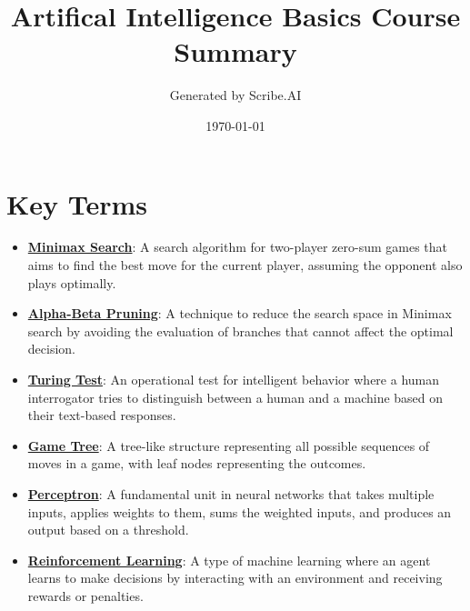 \documentclass{article}%
\title{Artifical Intelligence Basics Course Summary}%
\author{Generated by Scribe.AI}%
\date{\today}%
\begin{document}
%
\normalsize%
\maketitle%
\section{Key Terms}%
\label{sec:KeyTerms}%
\begin{itemize}[leftmargin=*]%
\item \href{https://www.math.purdue.edu/~yipn/351/02L2-Intro.pdf#page=22}{\textbf{Minimax Search}}: A search algorithm for two-player zero-sum games that aims to find the best move for the current player, assuming the opponent also plays optimally.%
\item \href{https://www.math.purdue.edu/~yipn/351/02L2-Intro.pdf#page=23}{\textbf{Alpha{-}Beta Pruning}}: A technique to reduce the search space in Minimax search by avoiding the evaluation of branches that cannot affect the optimal decision.%
\item \href{https://www.math.purdue.edu/~yipn/351/02L2-Intro.pdf#page=6}{\textbf{Turing Test}}: An operational test for intelligent behavior where a human interrogator tries to distinguish between a human and a machine based on their text-based responses.%
\item \href{https://www.math.purdue.edu/~yipn/351/02L2-Intro.pdf#page=11}{\textbf{Game Tree}}: A tree-like structure representing all possible sequences of moves in a game, with leaf nodes representing the outcomes.%
\item \href{https://www.math.purdue.edu/~yipn/351/02L2-Intro.pdf#page=45}{\textbf{Perceptron}}: A fundamental unit in neural networks that takes multiple inputs, applies weights to them, sums the weighted inputs, and produces an output based on a threshold.%
\item \href{https://www.math.purdue.edu/~yipn/351/02L2-Intro.pdf#page=46}{\textbf{Reinforcement Learning}}: A type of machine learning where an agent learns to make decisions by interacting with an environment and receiving rewards or penalties.%
\end{itemize}%
\end{document}
